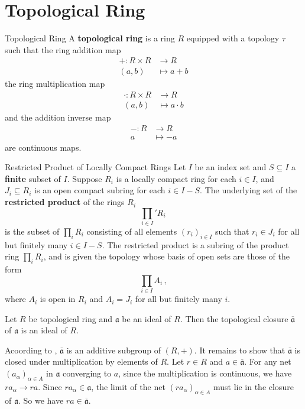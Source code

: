 \documentclass{report}
\begin{document}
\section{Topological Ring}
\begin{definition}{Topological Ring}{}
	A \textbf{topological ring} is a ring $R$ equipped with a topology $\tau$ such that the ring addition map
	\begin{align*}
		+:R\times R & \longrightarrow R \\
		(a,b)       & \longmapsto a+b
	\end{align*}
	the ring multiplication map
	\begin{align*}
		\cdot:R\times R & \longrightarrow R    \\
		(a,b)           & \longmapsto a\cdot b
	\end{align*}
	and the addition inverse map
	\begin{align*}
		-:R & \longrightarrow R \\
		a   & \longmapsto -a
	\end{align*}
	are continuous maps.
\end{definition}

\begin{definition}{Restricted Product of Locally Compact Rings}{}
	Let \( I \) be an index set and \( S\subseteq I \) a \textbf{finite} subset of \( I \). Suppose \( R_i \) is a locally compact ring for each \( i \in I \), and \( J_i \subseteq R_i \) is an open compact subring for each \( i \in I - S \). The underlying set of the \textbf{restricted product} of the rings \( R_i \)  
	\[
		\prod_{i\in I}' R_i\,
	\]
	is the subset of $\prod_i R_i$ consisting of all elements \( (r_i)_{i \in I} \) such that \( r_i \in J_i \) for all but finitely many \( i \in I - S \). The restricted product is a subring of the product ring $\prod_i R_i$, and is given the topology whose basis of open sets are those of the form
	\[
		\prod_{i\in I} A_i\,,
	\]
	where \( A_i \) is open in \( R_i \) and \( A_i = J_i \) for all but finitely many \( i \).
\end{definition}

\begin{proposition}{}{}
	Let $R$ be topological ring and $\mathfrak{a}$ be an ideal of $R$. Then the topological closure $\overline{\mathfrak{a}}$ of $\mathfrak{a}$ is an ideal of $R$.
\end{proposition}
\begin{prf}
	Acoording to , $\overline{\mathfrak{a}}$ is an additive subgroup of $(R,+)$. It remains to show that $\overline{\mathfrak{a}}$ is closed under multiplication by elements of $R$. Let $r\in R$ and $a\in \overline{\mathfrak{a}}$. For any net $(a_\alpha)_{\alpha\in A}$ in $\mathfrak{a}$ converging to $a$, since the multiplication is continuous, we have $r a_\alpha\to ra$. Since $ra_\alpha\in \mathfrak{a}$, the limit of the net $(ra_\alpha)_{\alpha\in A}$ must lie in the closure of $\mathfrak{a}$. So we have $ra\in \overline{\mathfrak{a}}$.
\end{prf}
\end{document}
